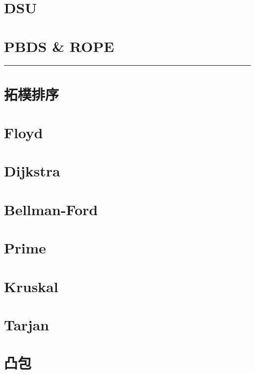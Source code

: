 \documentclass[a4paper]{article}
\begin{document}
\begin{CJK*}{UTF8}{bkai}
    \newpage
    \section{DSU}

    \newpage
    \section{PBDS \& ROPE}
    

    \hrule

    


    \newpage
    \section{拓樸排序}


    \newpage
    \section{Floyd}


    \newpage
    \section{Dijkstra}


    \newpage
    \section{Bellman-Ford}


    \newpage
    \section{Prime}


    \newpage
    \section{Kruskal}


    \newpage
    \section{Tarjan}




    \newpage
    \section{凸包}


\end{CJK*}
\end{document}
